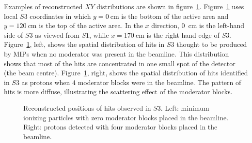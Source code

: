 Examples of reconstructed $XY$ distributions are shown in figure~\ref{fig:s3XY_pion}.
Figure~\ref{fig:s3XY_pion} uses local $\mathit{S3}$ coordinates in which $y=0~\text{cm}$ is the bottom of the active area and $y=120~\text{cm}$ is the top of the active area.
In the $x$ direction, 0~cm is the left-hand side of $\mathit{S3}$ as viewed from $\mathit{S1}$, while $x = 170~\text{cm}$ is the right-hand edge of $\mathit{S3}$.
Figure~\ref{fig:s3XY_pion}, left, shows the spatial distribution of hits in $\mathit{S3}$ thought to be produced by MIPs when no moderator was present in the beamline.
This distribution shows that most of the hits are concentrated in one small spot of the detector (the beam centre).
Figure~\ref{fig:s3XY_pion}, right, shows the spatial distribution of hits identified in $\mathit{S3}$ as protons when 4 moderator blocks were in the beamline.
The pattern of hits is more diffuse, illustrating the scattering effect of the moderator blocks.

\begin{figure}[t]
  \begin{minipage}[t]{0.49\textwidth}
    \centering
    \begin{adjustbox}{max totalsize={\textwidth}{.5\textheight},center}
      
    \end{adjustbox}
  \end{minipage} 	
  \hfill
  \begin{minipage}[t]{0.49\textwidth}
    \centering
    \begin{adjustbox}{max totalsize={\textwidth}{.5\textheight},center}
      
    \end{adjustbox}
  \end{minipage}  
   \caption{ \label{fig:s3XY_pion}Reconstructed positions of hits observed in $\mathit{S3}$. Left: minimum ionizing particles with zero moderator blocks placed in the beamline. Right: protons detected with four moderator blocks placed in the beamline.}
\end{figure}


